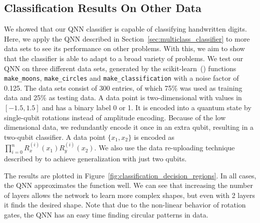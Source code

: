 \documentclass[a4paper,10pt]{article}
\begin{document}
\clearpage

\begin{appendices}
\section{Classification Results On Other Data} \label{sec:classification-other}
We showed that our QNN classifier is capable of classifying handwritten digits.
Here, we apply the QNN described in Section~\ref{sec:multiclass_classifier} to more data sets to see its performance on other problems.
With this, we aim to show that the classifier is able to adapt to a broad variety of problems.
We test our QNN on three different data sets, generated by the scikit-learn~(\cite{scikit-learn}) functions \verb|make_moons|, \verb|make_circles| and \verb|make_classification| with a noise factor of 0.125.
The data sets consist of 300 entries, of which 75\% was used as training data and 25\% as testing data.
A data point is two-dimensional with values in $[-1.5, 1.5]$ and has a binary label 0 or 1.
It is encoded into a quantum state by single-qubit rotations instead of amplitude encoding.
Because of the low dimensional data, we redundantly encode it once in an extra qubit, resulting in a two-qubit classifier.
A data point $\{x_1, x_2\}$ is encoded as $\prod_{i=0}^{n}R_x^{(i)}(x_1)R_y^{(i)}(x_2)$.
We also use the data re-uploading technique described by \textcite{perez2019data} to achieve generalization with just two qubits.

The results are plotted in Figure~\ref{fig:classification_decision_regions}.
In all cases, the QNN approximates the function well.
We can see that increasing the number of layers allows the network to learn more complex shapes, but even with 2 layers it finds the desired shape.
Note that due to the non-linear behavior of rotation gates, the QNN has an easy time finding circular patterns in data.


\end{appendices}
\end{document}
